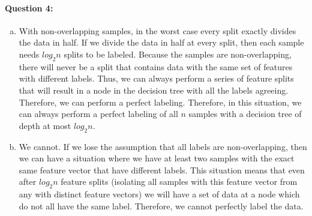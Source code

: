 \documentclass[letterpaper,11pt]{article}
\begin{document}
\paragraph{Question 4:}
\begin{enumerate}[(a)]
\item With non-overlapping samples, in the worst case every split exactly divides the data in half. If we divide the data in half
  at every split, then each sample needs $log_2 n$ splits to be labeled. Because the samples are non-overlapping, there will never
  be a split that contains data with the same set of features with different labels. Thus, we can always perform a series of feature
  splits that will result in a node in the decision tree with all the labels agreeing. Therefore, we can perform a perfect labeling.
  Therefore, in this situation, we can always perform a perfect labeling of all $n$ samples with a decision tree of depth at most
  $log_2 n$.
\item We cannot. If we lose the assumption that all labels are non-overlapping, then we can have a situation where we have at
  least two samples with the exact same feature vector that have different labels. This situation means that even after $log_2 n$
  feature splits (isolating all samples with this feature vector from any with distinct feature vectors) we will have a set
  of data at a node which do not all have the same label. Therefore, we cannot perfectly label the data.
\end{enumerate}
\end{document}

